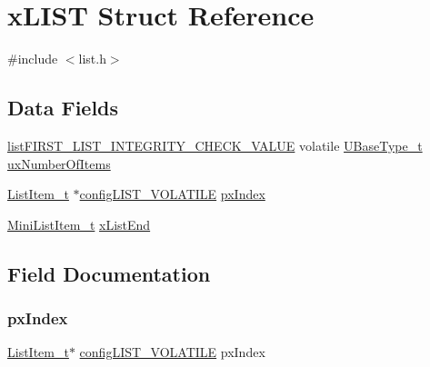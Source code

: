 \hypertarget{structx_l_i_s_t}{}\section{x\+L\+I\+ST Struct Reference}
\label{structx_l_i_s_t}


{\ttfamily \#include $<$list.\+h$>$}

\subsection*{Data Fields}
\begin{DoxyCompactItemize}
\item 
\mbox{\hyperlink{list_8h_a3a52b5a4f70d3a07e37a5814a23ba880}{list\+F\+I\+R\+S\+T\+\_\+\+L\+I\+S\+T\+\_\+\+I\+N\+T\+E\+G\+R\+I\+T\+Y\+\_\+\+C\+H\+E\+C\+K\+\_\+\+V\+A\+L\+UE}} volatile \mbox{\hyperlink{portmacro_8h_a646f89d4298e4f5afd522202b11cb2e6}{U\+Base\+Type\+\_\+t}} \mbox{\hyperlink{structx_l_i_s_t_a8fa392ba5e75883d007713e1e6c83a76}{ux\+Number\+Of\+Items}}
\item 
\mbox{\hyperlink{list_8h_a1a62d469392f9bfe2443e7efab9c8398}{List\+Item\+\_\+t}} $\ast$\mbox{\hyperlink{list_8h_a2d5de557c5561c8980d1bf51d87d8cba}{config\+L\+I\+S\+T\+\_\+\+V\+O\+L\+A\+T\+I\+LE}} \mbox{\hyperlink{structx_l_i_s_t_ae8639154918acc3f75d718480322aa82}{px\+Index}}
\item 
\mbox{\hyperlink{list_8h_a542a8d55e98bc407593979e61f83cd02}{Mini\+List\+Item\+\_\+t}} \mbox{\hyperlink{structx_l_i_s_t_a83a65be4e3a2bb70855742896126bf63}{x\+List\+End}}
\end{DoxyCompactItemize}


\subsection{Field Documentation}
\mbox{\label{structx_l_i_s_t_ae8639154918acc3f75d718480322aa82}} 
\subsubsection{\texorpdfstring{pxIndex}{pxIndex}}
{\footnotesize\ttfamily \mbox{\hyperlink{list_8h_a1a62d469392f9bfe2443e7efab9c8398}{List\+Item\+\_\+t}}$\ast$ \mbox{\hyperlink{list_8h_a2d5de557c5561c8980d1bf51d87d8cba}{config\+L\+I\+S\+T\+\_\+\+V\+O\+L\+A\+T\+I\+LE}} px\+Index}

\mbox{\label{structx_l_i_s_t_a8fa392ba5e75883d007713e1e6c83a76}} 
